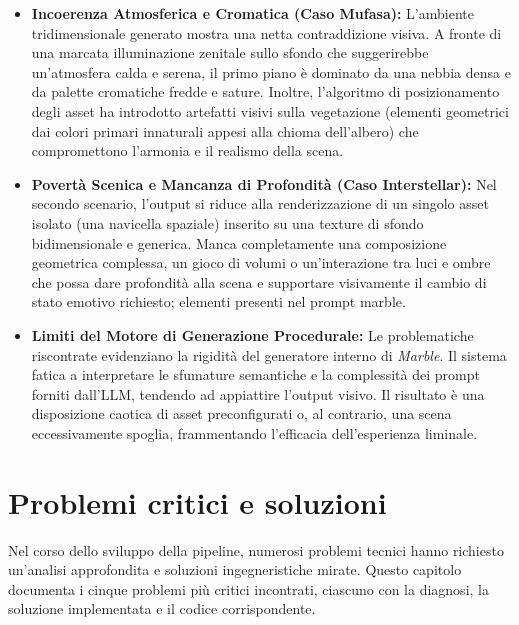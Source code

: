 \documentclass[11pt]{report}
\begin{document}
\begin{itemize}
    \item \textbf{Incoerenza Atmosferica e Cromatica (Caso Mufasa):} L'ambiente tridimensionale generato mostra una netta contraddizione visiva. A fronte di una marcata illuminazione zenitale sullo sfondo che suggerirebbe un'atmosfera calda e serena, il primo piano è dominato da una nebbia densa e da palette cromatiche fredde e sature. Inoltre, l'algoritmo di posizionamento degli asset ha introdotto artefatti visivi sulla vegetazione (elementi geometrici dai colori primari innaturali appesi alla chioma dell'albero) che compromettono l'armonia e il realismo della scena.
    \item \textbf{Povertà Scenica e Mancanza di Profondità (Caso Interstellar):} Nel secondo scenario, l'output si riduce alla renderizzazione di un singolo asset isolato (una navicella spaziale) inserito su una texture di sfondo bidimensionale e generica. Manca completamente una composizione geometrica complessa, un gioco di volumi o un'interazione tra luci e ombre che possa dare profondità alla scena e supportare visivamente il cambio di stato emotivo richiesto; elementi presenti nel prompt marble.
    \item \textbf{Limiti del Motore di Generazione Procedurale:} Le problematiche riscontrate evidenziano la rigidità del generatore interno di \textit{Marble}. Il sistema fatica a interpretare le sfumature semantiche e la complessità dei prompt forniti dall'LLM, tendendo ad appiattire l'output visivo. Il risultato è una disposizione caotica di asset preconfigurati o, al contrario, una scena eccessivamente spoglia, frammentando l'efficacia dell'esperienza liminale.
\end{itemize}
 
\chapter{Problemi critici e soluzioni}
\label{ch:problemi}
 
Nel corso dello sviluppo della pipeline, numerosi problemi tecnici hanno richiesto un'analisi approfondita e soluzioni ingegneristiche mirate. Questo capitolo documenta i cinque problemi più critici incontrati, ciascuno con la diagnosi, la soluzione implementata e il codice corrispondente.
 
\end{document}
